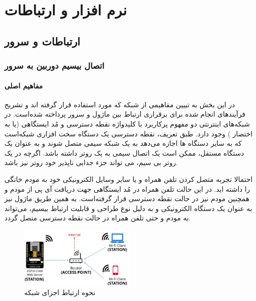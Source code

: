\chapter{نرم ‌افزار و ارتباطات}


\section{ارتباطات و سرور}

\subsection{اتصال بیسیم دوربین به سرور}

\subsubsection{مفاهیم اصلی}
در این بخش به تبیین مفاهیمی از شبکه
\noindent\unskip{}
که مورد استفاده قرار گرفته اند و تشریح فرآیندهای انجام شده برای برقراری ارتباط بین ماژول
و سرور پرداخته شده‌است. در شبکه‌های اینترنتی دو مفهوم پرکاربرد با کلیدواژه نقطه دسترسی
\noindent\unskip{}
و مُد
\noindent\unskip{}
ایستگاهی
\noindent\unskip{}
(یا به اختصار
)
وجود دارد. 
طبق تعریف، نقطه دسترسی
\cite{AccessPoint}
یک دستگاه سخت افزاری شبکه‌است که به سایر دستگاه ها اجازه می‌دهد به یک شبکه سیمی متصل شوند و به عنوان یک دستگاه مستقل، ممکن است یک اتصال سیمی به یک روتر
\noindent\unskip{}
داشته باشد. اگرچه در یک روتر بی سیم، می تواند جزء جدایی ناپذیر خود روتر نیز باشد.


احتمالا تجربه متصل کردن تلفن همراه و یا سایر وسایل الکترونیکی خود به مودم خانگی را داشته اید. در این حالت تلفن همراه در مُد ایستگاهی جهت دریافت آی پی
\noindent\unskip{}
از مودم و همچنین مودم نیز در حالت نقطه دسترسی قرار گرفته‌است. به همین طریق ماژول
نیز به عنوان یک دستگاه الکترونیکی و به دلیل نوع طراحی و قابلیت ارتباط بیسیم، می‌تواند به مودم و حتی تلفن همراه در حالت نقطه دسترسی متصل گردد. 
\begin{figure}[H]
	\centering
	\includegraphics[width=0.5\textwidth]{./images/Chapter3/RouterAsAccessPoint}	
	\caption[نقطه دسترسی و مُد ایستگاهی]{نحوه ارتباط اجزای شبکه \cite{Network}}
	\label{}
\end{figure}
\noindent
\unskip

